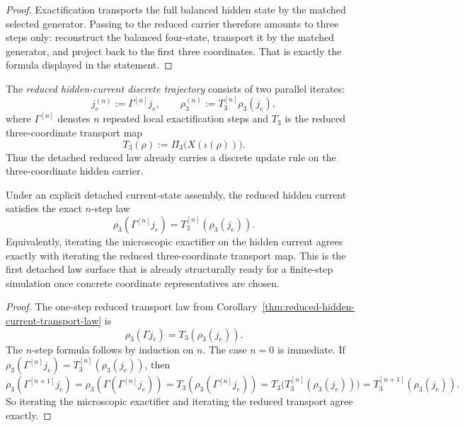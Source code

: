 \begin{proof}
Exactification transports the full balanced hidden state by the matched
selected generator. Passing to the reduced carrier therefore amounts to three
steps only: reconstruct the balanced four-state, transport it by the matched
generator, and project back to the first three coordinates. That is exactly the
formula displayed in the statement.
\end{proof}

\begin{definition}
\label{def:reduced-hidden-current-discrete-trajectory}
The \emph{reduced hidden-current discrete trajectory} consists of two parallel
iterates:
\[
j_e^{(n)} := \Gamma^{[n]} j_e,
\qquad
\rho_3^{(n)} := T_3^{[n]} \rho_3(j_e),
\]
where \(\Gamma^{[n]}\) denotes \(n\) repeated local exactification steps and
\(T_3\) is the reduced three-coordinate transport map
\[
T_3(\rho) := \Pi_3\!\bigl(X(\iota(\rho))\bigr).
\]
Thus the detached reduced law already carries a discrete update rule on the
three-coordinate hidden carrier.
\end{definition}

\begin{corollary}
\label{thm:reduced-hidden-current-discrete-trajectory-law}
Under an explicit detached current-state assembly, the reduced hidden current
satisfies the exact \(n\)-step law
\[
\rho_3(\Gamma^{[n]} j_e)
=
T_3^{[n]}(\rho_3(j_e)).
\]
Equivalently, iterating the microscopic exactifier on the hidden current agrees
exactly with iterating the reduced three-coordinate transport map. This is the
first detached law surface that is already structurally ready for a finite-step
simulation once concrete coordinate representatives are chosen.
\end{corollary}

\begin{proof}
The one-step reduced transport law from
Corollary~\ref{thm:reduced-hidden-current-transport-law} is
\[
\rho_3(\Gamma j_e)=T_3(\rho_3(j_e)).
\]
The \(n\)-step formula follows by induction on \(n\). The case \(n=0\) is
immediate. If
\(\rho_3(\Gamma^{[n]}j_e)=T_3^{[n]}(\rho_3(j_e))\),
then
\[
\rho_3(\Gamma^{[n+1]}j_e)
=
\rho_3(\Gamma(\Gamma^{[n]}j_e))
=
T_3(\rho_3(\Gamma^{[n]}j_e))
=
T_3\bigl(T_3^{[n]}(\rho_3(j_e))\bigr)
=
T_3^{[n+1]}(\rho_3(j_e)).
\]
So iterating the microscopic exactifier and iterating the reduced transport
agree exactly.
\end{proof}

